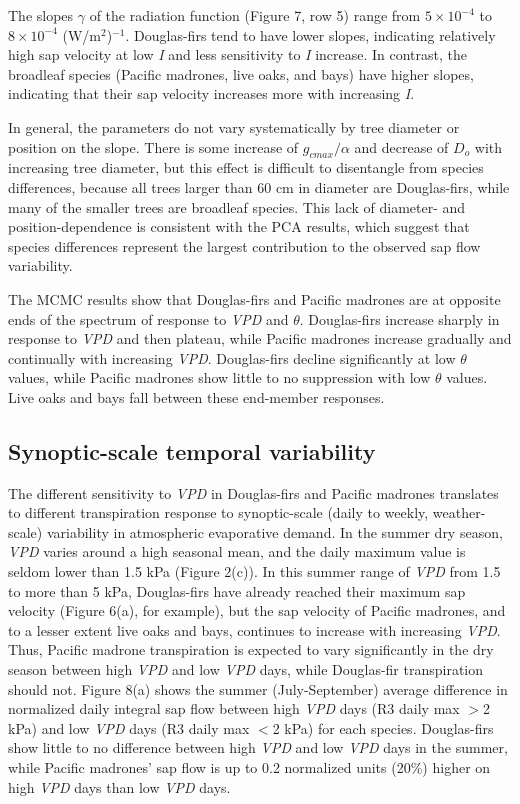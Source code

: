 The slopes $\gamma$ of the radiation function (Figure 7, row 5) range from $5 \times 10^{-4}$ to $8 \times 10^{-4}$ (W/m$^2$)$^{-1}$.  Douglas-firs tend to have lower slopes, indicating relatively high sap velocity at low \textit{I} and less sensitivity to \textit{I} increase.  In contrast, the broadleaf species (Pacific madrones, live oaks, and bays) have higher slopes, indicating that their sap velocity increases more with increasing \textit{I}.

In general, the parameters do not vary systematically by tree diameter or position on the slope.  There is some increase of $g_{cmax}/\alpha$ and decrease of $D_o$ with increasing tree diameter, but this effect is difficult to disentangle from species differences, because all trees larger than 60 cm in diameter are Douglas-firs, while many of the smaller trees are broadleaf species.  This lack of diameter- and position-dependence is consistent with the PCA results, which suggest that species differences represent the largest contribution to the observed sap flow variability.

The MCMC results show that Douglas-firs and Pacific madrones are at opposite ends of the spectrum of response to \textit{VPD} and $\theta$.  Douglas-firs increase sharply in response to \textit{VPD} and then plateau, while Pacific madrones increase gradually and continually with increasing \textit{VPD}.  Douglas-firs decline significantly at low $\theta$ values, while Pacific madrones show little to no suppression with low $\theta$ values.  Live oaks and bays fall between these end-member responses.

\subsection{Synoptic-scale temporal variability}
The different sensitivity to \textit{VPD} in Douglas-firs and Pacific madrones translates to different transpiration response to synoptic-scale (daily to weekly, weather-scale) variability in atmospheric evaporative demand.  In the summer dry season, \textit{VPD} varies around a high seasonal mean, and the daily maximum value is seldom lower than 1.5 kPa (Figure 2(c)).  In this summer range of \textit{VPD} from 1.5 to more than 5 kPa, Douglas-firs have already reached their maximum sap velocity (Figure 6(a), for example), but the sap velocity of Pacific madrones, and to a lesser extent live oaks and bays, continues to increase with increasing \textit{VPD}.  Thus, Pacific madrone transpiration is expected to vary significantly in the dry season between high \textit{VPD} and low \textit{VPD} days, while Douglas-fir transpiration should not.  Figure 8(a) shows the summer (July-September) average difference in normalized daily integral sap flow between high \textit{VPD} days (R3 daily max $>$2 kPa) and low \textit{VPD} days (R3 daily max $<$2 kPa) for each species.  Douglas-firs show little to no difference between high \textit{VPD} and low \textit{VPD} days in the summer, while Pacific madrones' sap flow is up to 0.2 normalized units (20\%) higher on high \textit{VPD} days than low \textit{VPD} days.

